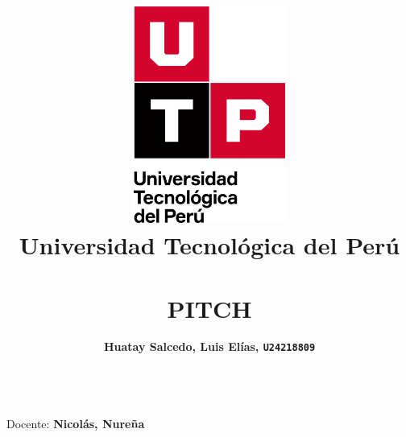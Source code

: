 \documentclass{article}
\title{
  \pagenumbering{gobble}
  \vspace{1cm}
  \includegraphics[width=5cm,clip,trim=0cm 2.9cm 0cm 0cm]{./assets/isotipo-utp.png} \\
  \vspace{0.5cm}
  \textbf{Universidad Tecnológica del Perú} \\
  \vspace{0.5cm}
  \text{Negociación y Narrativa} \\
  \vspace{1cm}
    {\huge \textbf{PITCH}} \\
  \vspace{1cm}
}
\author{
  \begin{tabular}{ll}
    \textbf{Huatay Salcedo, Luis Elías, \texttt{U24218809}}\\
  \end{tabular} \\
}
\begin{document}
\maketitle
\begin{center}
  Docente: \textbf{Nicolás, Nureña}
\end{center}

%
%




\newpage
\setcounter{page}{1}  

\end{document}
